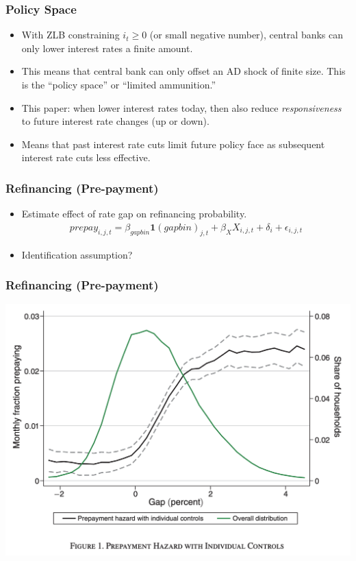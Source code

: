 \documentclass[english,xcolor=svgnames]{beamer}
\begin{document}
\begin{frame}
    \frametitle{Policy Space}
    \begin{itemize}
    	\item With ZLB constraining $i_t \ge 0$ (or small negative number), central banks can only lower interest rates a finite amount.
    	\item This means that central bank can only offset an AD shock of finite size. This is the ``policy space'' or ``limited ammunition.''
    	\item This paper: when lower interest rates today, then also reduce \emph{responsiveness} to future interest rate changes (up or down).
    	\item Means that past interest rate cuts limit future policy face as subsequent interest rate cuts less effective.
    \end{itemize}
\end{frame}


\begin{frame}
    \frametitle{Refinancing (Pre-payment)}
    \begin{itemize}
    	\item Estimate effect of rate gap on refinancing probability.
    	\begin{align*}
    	prepay_{i,j,t} = \beta_{gapbin} \bm{1}(gapbin)_{j,t} + \beta_X X_{i,j,t} + \delta_i + \epsilon_{i,j,t}
    \end{align*}
    \item Identification assumption?
    \end{itemize}
\end{frame}

\begin{frame}
    \frametitle{Refinancing (Pre-payment)}
    \begin{center}
    	\includegraphics[scale=0.3]{figures/BMTVFIG1.png}	
    \end{center}
\end{frame}
\end{document}
